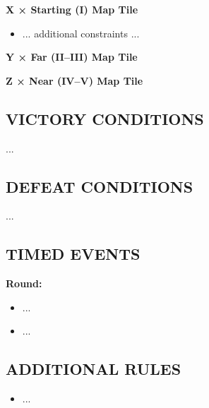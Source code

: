 \begin{multicols*}{2}
  \textbf{X × Starting (I) Map Tile}
\begin{itemize}
    \item ... additional constraints ...
\end{itemize}

\textbf{Y × Far (II--III) Map Tile}

\textbf{Z × Near (IV--V) Map Tile}

\subsection*{\MakeUppercase{Victory Conditions}}
...

\subsection*{\MakeUppercase{Defeat Conditions}}
...

\subsection*{\MakeUppercase{Timed Events}}

\textbf{ Round:}
\begin{itemize}
  \item ...
  \item ...
\end{itemize}

%
%
%

\subsection*{\MakeUppercase{Additional Rules}}

\begin{itemize}
    \item ...
\end{itemize}

\end{multicols*}


